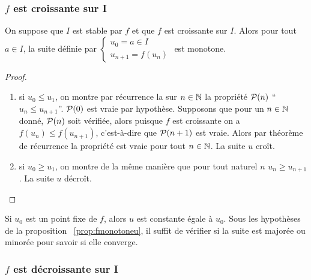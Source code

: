 \subsubsection{\(f\) est croissante sur I}

\begin{prop}\label{prop:fmonotoneu}
  On suppose que \(I\) est stable par \(f\) et que \(f\) est croissante sur \(I\). Alors pour tout \(a \in I\), la suite définie par \(\begin{cases} u_0=a \in I \\ u_{n+1}=f(u_n) \end{cases}\) est monotone.
\end{prop}
\begin{proof}
  \begin{enumerate}
  \item si \(u_0 \leqslant u_1\), on montre par récurrence la sur \(n \in \N\) la propriété \(\P(n)\) ``\(u_n \leqslant u_{n+1}\)''. \(\P(0)\) est vraie par hypothèse. Supposons que pour un \(n \in \N\) donné, \(\P(n)\) soit vérifiée, alors puisque \(f\) est croissante on a \(f(u_n) \leqslant f(u_{n+1})\), c'est-à-dire que \(\P(n+1)\) est vraie. Alors par théorème de récurrence la propriété est vraie pour tout \(n \in \N\). La suite \(u\) croît.
  \item si \(u_0 \geqslant u_1\), on montre de la même manière que pour tout naturel \(n\) \(u_n \geqslant u_{n+1}\). La suite \(u\) décroît.
  \end{enumerate}
\end{proof}

Si \(u_0\) est un point fixe de \(f\), alors \(u\) est constante égale à \(u_0\). Sous les hypothèses de la proposition~
\ref{prop:fmonotoneu}, il suffit de vérifier si la suite est majorée ou minorée pour savoir si elle converge.

\subsubsection{\(f\) est décroissante sur I}


